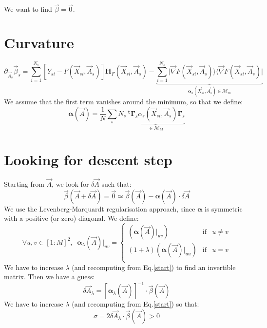 \documentclass[aps,12pt]{revtex4}
\newcommand{\trn}[1]{~^{\mathtt{t}}{#1}}
\begin{document}
We want to find $\vec{\beta} = \vec{0}$.

\section{Curvature}
\begin{equation}
	\partial_{\vec{A}_s} \vec{\beta}_s = \sum_{i=1}^{N_s}  \left[ Y_{si} - F(\vec{X}_{si},\vec{A}_s) \right] \bm{H}_F(\vec{X}_{si},\vec{A}_s)
	- \underbrace{
	\sum_{i=1}^{N_s} \vert\vec{\nabla} F(\vec{X}_{si},\vec{A}_s) \rangle  \langle\vec{\nabla} F(\vec{X}_{si},\vec{A}_s)\vert
	}_{\bm{\alpha}_s(\vec{X}_{si},\vec{A}_s)\in\mathcal{M}_{m} }
\end{equation}
We assume that the first term vanishes around the minimum, so that we define:
\begin{equation}
	\bm{\alpha}(\vec{A}) = \dfrac{1}{N} \sum_s N_s \underbrace{\trn{\bm{\Gamma}_s} \alpha_s (\vec{X}_{si},\vec{A}_s) \bm{\Gamma}_s}_{\in \mathcal{M}_M}
\end{equation}

\section{Looking for descent step}

Starting from $\vec{A}$, we look for $\delta\vec{A}$ such that:
\begin{equation}
	\vec{\beta}(\vec{A}+\delta\vec{A}) = \vec{0} \simeq \vec{\beta}(\vec{A}) - \bm{\alpha}(\vec{A}) \cdot \delta \vec{A}
\end{equation}
We use the Levenberg-Marquardt regularisation approach, since $\bm{\alpha}$ is symmetric with a positive (or zero) diagonal.
We define:
\begin{equation}
\label{start}
\forall u,v \in [1:M]^2, \;\;
	\bm{\alpha}_{\lambda}(\vec{A})\vert_{uv} = 
	\left\lbrace
	\begin{array}{rcl}
	(\bm{\alpha}(\vec{A})\vert_{uv}) & \text{if} & u\not=v\\
	(1+\lambda)(\bm{\alpha}(\vec{A})\vert_{uu})  & \text{if} & u=v\\
	\end{array}
	\right.
\end{equation}
We have to increase $\lambda$ (and recomputing from Eq.\eqref{start}) to find an invertible matrix.
Then we have a guess:
\begin{equation}
	\delta\vec{A}_\lambda = \left[\bm{\alpha}_\lambda(\vec{A})\right]^{-1} \cdot \vec{\beta}(\vec{A})
\end{equation}
We have to increase $\lambda$ (and recomputing from Eq.\eqref{start}) so that:
\begin{equation}
	\sigma = 2\delta\vec{A}_\lambda \cdot \vec{\beta}(\vec{A}) > 0
\end{equation}
 
\end{document}
